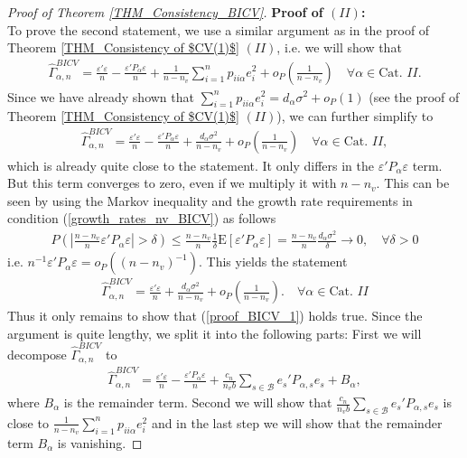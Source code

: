 \documentclass[Research_Module_ES.tex]{subfiles}
\begin{document}
\begin{proof}[Proof of Theorem \ref{THM_Consistency_BICV}]
	\textbf{Proof of $(II)$:} \\
	To prove the second statement, we use a similar argument as in the proof of Theorem \ref{THM_Consistency of $CV(1)$} $(II)$, i.e. we will show that
	\begin{align}
	\hat{\Gamma}_{\alpha,n}^{BICV} = \frac{\varepsilon'\varepsilon}{n}-\frac{\varepsilon'P_\alpha\varepsilon}{n}+\frac{1}{n-n_v}\sum_{i=1}^np_{ii\alpha}e_i^2+o_P\left(\frac{1}{n-n_v}\right) \quad \forall \alpha\in \textrm{Cat. $II$}. \label{proof_BICV_1}
	\end{align}
	Since we have already shown that $\sum_{i=1}^np_{ii\alpha}e_i^2=d_\alpha\sigma^2 +o_P(1)$ (see the proof of Theorem \ref{THM_Consistency of $CV(1)$} $(II)$), we can further simplify to
	\begin{align*}
	\hat{\Gamma}_{\alpha,n}^{BICV} = \frac{\varepsilon'\varepsilon}{n}-\frac{\varepsilon'P_\alpha\varepsilon}{n}+\frac{d_\alpha\sigma^2}{n-n_v}+o_P\left(\frac{1}{n-n_v}\right) \quad \forall \alpha\in \textrm{Cat. $II$},
	\end{align*}
	which is already quite close to the statement. It only differs in the $\varepsilon'P_\alpha\varepsilon$ term. But this term converges to zero, even if we multiply it with $n-n_v$. This can be seen by using the Markov inequality and the growth rate requirements in condition (\ref{growth_rates_nv_BICV}) as follows
	\begin{align*}
	P\left(\left\lvert \frac{n-n_v}{n}\varepsilon'P_\alpha\varepsilon\right\rvert > \delta\right)\le \frac{n-n_v}{n}\frac{1}{\delta}\mathrm{E}[\varepsilon'P_\alpha\varepsilon]=\frac{n-n_v}{n}\frac{d_\alpha\sigma^2}{\delta}\to 0,\quad\forall \delta >0
	\end{align*}
	i.e. $n^{-1}\varepsilon'P_\alpha\varepsilon=o_P((n-n_v)^{-1})$. This yields the statement
	\begin{align*}
	\hat{\Gamma}_{\alpha,n}^{BICV} = \frac{\varepsilon'\varepsilon}{n}+\frac{d_\alpha\sigma^2}{n-n_v}+o_P\left(\frac{1}{n-n_v}\right). \quad \forall \alpha\in \textrm{Cat. $II$}
	\end{align*}
	Thus it only remains to show that (\ref{proof_BICV_1}) holds true. Since the argument is quite lengthy, we split it into the following parts: 	
	First we will decompose $\hat{\Gamma}_{\alpha,n}^{BICV}$ to 
	\begin{align*}
	\hat{\Gamma}_{\alpha,n}^{BICV} = \frac{\varepsilon'\varepsilon}{n}-\frac{\varepsilon'P_\alpha\varepsilon}{n}+\frac{c_n}{n_v b}\sum_{s\in \mathcal{B}}e_s'P_{\alpha,s}e_s+B_\alpha,
	\end{align*}
	where $B_\alpha$ is the remainder term.
	Second we will show that $\frac{c_n}{n_v b}\sum_{s\in \mathcal{B}}e_s'P_{\alpha,s}e_s$ is close to $\frac{1}{n-n_v}\sum_{i=1}^np_{ii\alpha}e_i^2$ and in the last step we will show that the remainder term $B_\alpha$ is vanishing.
	

\end{proof}
\end{document}
